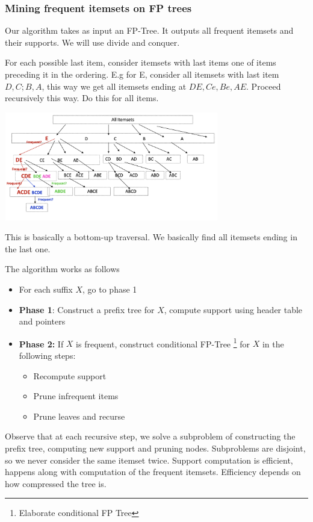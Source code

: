     \subsubsection{Mining frequent itemsets on FP trees}
        Our algorithm takes as input an FP-Tree. It outputs all frequent itemsets and their supports. We will use divide and conquer.
        
        For each possible last item, consider itemsets with last items one of items preceding it in the ordering. E.g for E, consider all itemsets with last item $D, C; B, A$, this way we get all itemsets ending at $DE, Ce, Be, AE$. Proceed recursively this way. Do this for all items.
    
        \begin{center}
            \includegraphics[width=0.7\textwidth]{images/miningfp.png}
        \end{center}
        
        This is basically a bottom-up traversal. We basically find all itemsets ending in the last one. 
        
        The algorithm works as follows
        \begin{itemize}
            \item For each suffix $X$, go to phase 1
            \item \textbf{Phase 1}: Construct a prefix tree for $X$, compute support using header table and pointers
            \item \textbf{Phase 2:} If $X$ is frequent, construct conditional FP-Tree \footnote{Elaborate conditional FP Tree} for $X$ in the following steps: \begin{itemize}
                \item Recompute support
                \item Prune infrequent items
                \item Prune leaves and recurse
            \end{itemize}
        \end{itemize}
        
        Observe that at each recursive step, we solve a subproblem of constructing the prefix tree, computing new support and pruning nodes. Subproblems are disjoint, so we never consider the same itemset twice. Support computation is efficient, happens along with computation of the frequent itemsets. Efficiency depends on how compressed the tree is.
